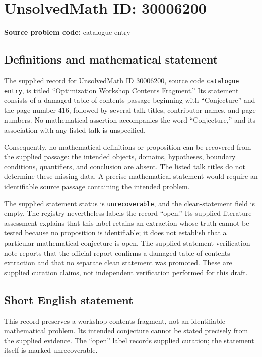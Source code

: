 \documentclass[11pt]{article}
\begin{document}
\section*{UnsolvedMath ID: 30006200}
\textbf{Source problem code:} catalogue entry
\subsection{Definitions and mathematical statement}
The supplied record for UnsolvedMath ID \(30006200\), source code \texttt{catalogue entry}, is titled ``Optimization Workshop Contents Fragment.'' Its statement consists of a damaged table-of-contents passage beginning with ``Conjecture'' and the page number 416, followed by several talk titles, contributor names, and page numbers. No mathematical assertion accompanies the word ``Conjecture,'' and its association with any listed talk is unspecified.

Consequently, no mathematical definitions or proposition can be recovered from the supplied passage: the intended objects, domains, hypotheses, boundary conditions, quantifiers, and conclusion are absent. The listed talk titles do not determine these missing data. A precise mathematical statement would require an identifiable source passage containing the intended problem.

The supplied statement status is \texttt{unrecoverable}, and the clean-statement field is empty. The registry nevertheless labels the record ``open.'' Its supplied literature assessment explains that this label retains an extraction whose truth cannot be tested because no proposition is identifiable; it does not establish that a particular mathematical conjecture is open. The supplied statement-verification note reports that the official report confirms a damaged table-of-contents extraction and that no separate clean statement was promoted. These are supplied curation claims, not independent verification performed for this draft.
\subsection{Short English statement}
This record preserves a workshop contents fragment, not an identifiable mathematical problem. Its intended conjecture cannot be stated precisely from the supplied evidence. The ``open'' label records supplied curation; the statement itself is marked unrecoverable.
\end{document}
